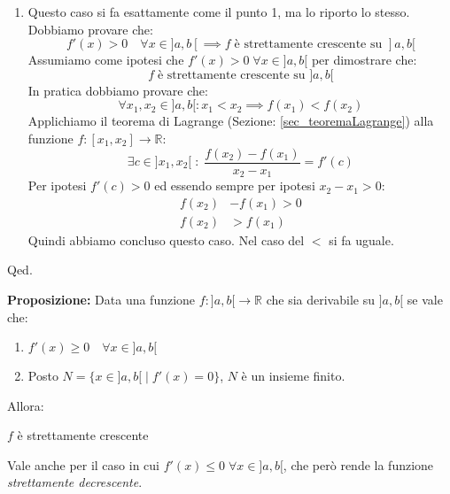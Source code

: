 {\begin{enumerate}
		\item Questo caso si fa esattamente come il punto 1, ma lo riporto lo stesso. Dobbiamo provare che:
			\begin{equation*}
				f'(x) > 0 \quad \forall x \in ]a,b[ \implies f \; \text{è strettamente crescente su } ]a,b[
			\end{equation*}
			Assumiamo come ipotesi che  $f'(x) > 0 \; \forall x \in ]a,b[$ per dimostrare che:
			\begin{equation*}
				f \; \text{è strettamente crescente su } ]a,b[
			\end{equation*}
			In pratica dobbiamo provare che:
			\begin{equation*}
				\forall x_1, x_2 \in ]a,b[ : x_1 < x_2 \implies f(x_1) < f(x_2)
			\end{equation*}
			Applichiamo il teorema di Lagrange (Sezione: \ref{sec_teoremaLagrange}) alla funzione $f:[x_1, x_2] \to \mathbb{R}$:
			\begin{equation*}
				\exists c \in ]x_1, x_2[ \; : \; \dfrac{f(x_2) - f(x_1)}{x_2 - x_1} = f'(c)
			\end{equation*}
			Per ipotesi $f'(c) > 0$ ed essendo sempre per ipotesi $x_2 - x_1 > 0$:
			\begin{align*}
				f(x_2) &- f(x_1) > 0\\[10pt]
				f(x_2) &> f(x_1)
			\end{align*}
			Quindi abbiamo concluso questo caso. Nel caso del $<$ si fa uguale.\\
	\end{enumerate}
	\hfill Qed.
}

\textbf{Proposizione:} Data una funzione $f:]a,b[ \to \mathbb{R}$ che sia derivabile su $]a,b[$ se vale che:
\begin{enumerate}
	\item $f'(x) \geq 0 \quad \forall x \in ]a,b[$ 
	
	\item Posto $N = \{x \in ]a,b[ \; | \; f'(x) = 0\}$, $N$ è un insieme finito.
\end{enumerate}
Allora:
\begin{center}
	$f$ è strettamente crescente
\end{center}
Vale anche per il caso in cui $f'(x) \leq 0 \; \forall x \in ]a,b[$, che però rende la funzione \textit{strettamente decrescente}.

